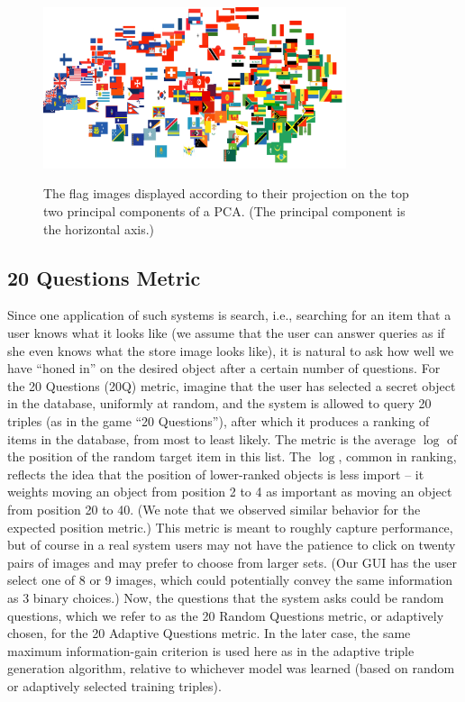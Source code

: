 \documentclass{article}
\begin{document}
\begin{figure}
{\center \includegraphics[width=3.5in]{flags_pca.pdf}} \caption{\label{fig:flagspca} The flag images displayed according to their projection on the top two principal components of a PCA.  (The principal component
is the horizontal axis.)}
\end{figure}

\subsection{20 Questions Metric}
Since one application of such systems is search, i.e., searching for an item that a user knows what it looks like (we assume that the user can answer queries as if she even knows what the store image looks like), it is natural to ask how well we have ``honed in'' on the desired object after a certain number of questions.  For the 20 Questions (20Q) metric, imagine that the user has selected a secret object in the database, uniformly at random, and the system is allowed to query 20 triples (as in the game ``20 Questions''), after which it produces a ranking of items in the database, from most to least likely.  The metric is the average $\log$ of the position of the random target item in this list.  The $\log$, common in ranking, reflects the idea that the position of lower-ranked objects is less import -- it weights moving an object from position 2 to 4 as important as moving an object from position 20 to 40.  (We note that we observed similar behavior for the expected position metric.)  This metric is meant to roughly capture performance, but of course in a real system users may not have the patience to click on twenty pairs of images and may prefer to choose from larger sets. (Our GUI has the user select one of 8 or 9 images, which could potentially convey the same information as 3 binary choices.)  Now, the questions that the system asks could be random questions, which we refer to as the 20 Random Questions metric, or adaptively chosen, for the 20 Adaptive Questions metric.  In the later case, the same maximum information-gain criterion is used here as in the adaptive triple generation algorithm, relative to whichever model was learned (based on random or adaptively selected training triples).
\end{document}
